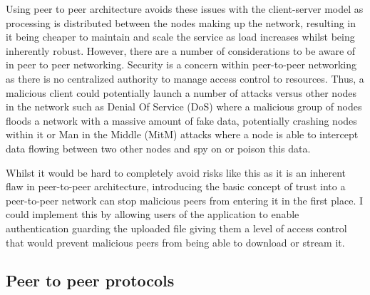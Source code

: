 \documentclass[]{report}
\begin{document}
			Using peer to peer architecture avoids these issues with the client-server model as processing is distributed between the nodes making up the network, resulting in it being cheaper to maintain and scale the service as load increases whilst being inherently robust. However, there are a number of considerations to be aware of in peer to peer networking. Security is a concern within peer-to-peer networking as there is no centralized authority to manage access control to resources. Thus, a malicious client could potentially launch a number of attacks versus other nodes in the network such as Denial Of Service (DoS) where a malicious group of nodes floods a network with a massive amount of fake data, potentially crashing nodes within it or Man in the Middle (MitM) attacks where a node is able to intercept data flowing between two other nodes and spy on or poison this data.\cite{P2P Security Issues}
			
			Whilst it would be hard to completely avoid risks like this as it is an inherent flaw in peer-to-peer architecture, introducing the basic concept of trust into a peer-to-peer network can stop malicious peers from entering it in the first place. I could implement this by allowing users of the application to enable authentication guarding the uploaded file giving them a level of access control that would prevent malicious peers from being able to download or stream it. 		
		\subsection*{Peer to peer protocols}
			
\end{document}
